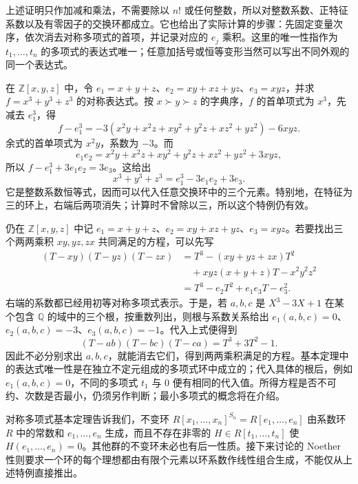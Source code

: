 上述证明只作加减和乘法，不需要除以 \(n!\) 或任何整数，所以对整数系数、正特征系数以及有零因子的交换环都成立。它也给出了实际计算的步骤：先固定变量次序，依次消去对称多项式的首项，并记录对应的 \(e_j\) 乘积。这里的唯一性指作为 \(t_1,\ldots,t_n\) 的多项式的表达式唯一；任意加括号或恒等变形当然可以写出不同外观的同一个表达式。

\begin{example}\label{b1:exm:symmetric-cubic-expression}
	在 \(\mathbb Z[x,y,z]\) 中，令 \(e_1=x+y+z\)、\(e_2=xy+xz+yz\)、\(e_3=xyz\)，并求 \(f=x^3+y^3+z^3\) 的对称表达式。按 \(x\succ y\succ z\) 的字典序，\(f\) 的首单项式为 \(x^3\)，先减去 \(e_1^3\)，得
	\[
		f-e_1^3=-3(x^2y+x^2z+xy^2+y^2z+xz^2+yz^2)-6xyz.
	\]
	余式的首单项式为 \(x^2y\)，系数为 \(-3\)。而
	\[
		e_1e_2=x^2y+x^2z+xy^2+y^2z+xz^2+yz^2+3xyz,
	\]
	所以 \(f-e_1^3+3e_1e_2=3e_3\)。这给出
	\begin{equation}\label{b1:eq:power-sum-three}
		x^3+y^3+z^3=e_1^3-3e_1e_2+3e_3.
	\end{equation}
	它是整数系数恒等式，因而可以代入任意交换环中的三个元素。特别地，在特征为三的环上，右端后两项消失；计算时不曾除以三，所以这个特例仍有效。
\end{example}

\begin{example}\label{b1:exm:symmetric-elimination}
	仍在 \(\mathbb Z[x,y,z]\) 中记 \(e_1=x+y+z\)、\(e_2=xy+xz+yz\)、\(e_3=xyz\)。若要找出三个两两乘积 \(xy,yz,zx\) 共同满足的方程，可以先写
	\[
		\begin{aligned}
			(T-xy)(T-yz)(T-zx) &=T^3-(xy+yz+zx)T^2\\
			&\quad+xyz(x+y+z)T-x^2y^2z^2\\
			&=T^3-e_2T^2+e_1e_3T-e_3^2.
		\end{aligned}
	\]
	右端的系数都已经用初等对称多项式表示。于是，若 \(a,b,c\) 是 \(X^3-3X+1\) 在某个包含 \(\mathbb Q\) 的域中的三个根，按重数列出，则根与系数关系给出 \(e_1(a,b,c)=0\)、\(e_2(a,b,c)=-3\)、\(e_3(a,b,c)=-1\)。代入上式便得到
	\[
		(T-ab)(T-bc)(T-ca)=T^3+3T^2-1.
	\]
	因此不必分别求出 \(a,b,c\)，就能消去它们，得到两两乘积满足的方程。基本定理中的表达式唯一性是在独立不定元组成的多项式环中成立的；代入具体的根后，例如 \(e_1(a,b,c)=0\)，不同的多项式 \(t_1\) 与 \(0\) 便有相同的代入值。所得方程是否不可约、次数是否最小，仍须另作判断；最小多项式的概念将在介绍。
\end{example}

对称多项式基本定理告诉我们，不变环 \(R[x_1,\ldots,x_n]^{S_n}=R[e_1,\ldots,e_n]\) 由系数环 \(R\) 中的常数和 \(e_1,\ldots,e_n\) 生成，而且不存在非零的 \(H\in R[t_1,\ldots,t_n]\) 使 \(H(e_1,\ldots,e_n)=0\)。其他群的不变环未必也有后一性质。接下来讨论的 Noether 性则要求一个环的每个理想都由有限个元素以环系数作线性组合生成，不能仅从上述特例直接推出。

